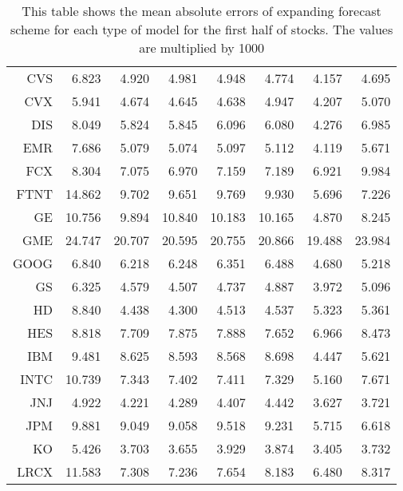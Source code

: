 \begin{table}[ht]
\begin{tabular}{rrrrrrrr}
  CVS & 6.823 & 4.920 & 4.981 & 4.948 & 4.774 & 4.157 & 4.695 \\ 
  CVX & 5.941 & 4.674 & 4.645 & 4.638 & 4.947 & 4.207 & 5.070 \\ 
  DIS & 8.049 & 5.824 & 5.845 & 6.096 & 6.080 & 4.276 & 6.985 \\ 
  EMR & 7.686 & 5.079 & 5.074 & 5.097 & 5.112 & 4.119 & 5.671 \\ 
  FCX & 8.304 & 7.075 & 6.970 & 7.159 & 7.189 & 6.921 & 9.984 \\ 
  FTNT & 14.862 & 9.702 & 9.651 & 9.769 & 9.930 & 5.696 & 7.226 \\ 
  GE & 10.756 & 9.894 & 10.840 & 10.183 & 10.165 & 4.870 & 8.245 \\ 
  GME & 24.747 & 20.707 & 20.595 & 20.755 & 20.866 & 19.488 & 23.984 \\ 
  GOOG & 6.840 & 6.218 & 6.248 & 6.351 & 6.488 & 4.680 & 5.218 \\ 
  GS & 6.325 & 4.579 & 4.507 & 4.737 & 4.887 & 3.972 & 5.096 \\ 
  HD & 8.840 & 4.438 & 4.300 & 4.513 & 4.537 & 5.323 & 5.361 \\ 
  HES & 8.818 & 7.709 & 7.875 & 7.888 & 7.652 & 6.966 & 8.473 \\ 
  IBM & 9.481 & 8.625 & 8.593 & 8.568 & 8.698 & 4.447 & 5.621 \\ 
  INTC & 10.739 & 7.343 & 7.402 & 7.411 & 7.329 & 5.160 & 7.671 \\ 
  JNJ & 4.922 & 4.221 & 4.289 & 4.407 & 4.442 & 3.627 & 3.721 \\ 
  JPM & 9.881 & 9.049 & 9.058 & 9.518 & 9.231 & 5.715 & 6.618 \\ 
  KO & 5.426 & 3.703 & 3.655 & 3.929 & 3.874 & 3.405 & 3.732 \\ 
  LRCX & 11.583 & 7.308 & 7.236 & 7.654 & 8.183 & 6.480 & 8.317 \\ 
   \hline
\end{tabular}
\caption[MAE expanding forecast (1)]{This table shows the mean absolute errors of expanding forecast scheme for each type of model for the first half of stocks. 
                     The values are multiplied by 1000} 
\label{Table:MAE_e_1}
\end{table}
